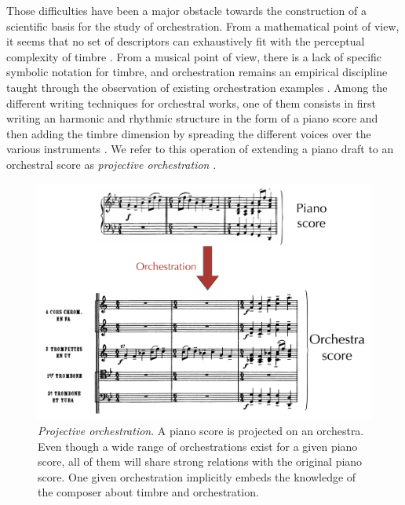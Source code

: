 \documentclass{article}
\begin{document}
Those difficulties have been a major obstacle towards the construction of a scientific basis for the study of orchestration. From a mathematical point of view, it seems that no set of descriptors can exhaustively fit with the perceptual complexity of timbre \cite{peeters2011timbre}. From a musical point of view, there is a lack of specific symbolic notation for timbre, and orchestration remains an empirical discipline taught through the observation of existing orchestration examples \cite{piston-orch}. Among the different writing techniques for orchestral works, one of them consists in first writing an harmonic and rhythmic structure in the form of a piano score and then adding the timbre dimension by spreading the different voices over the various instruments \cite{piston-orch}. We refer to this operation of extending a piano draft to an orchestral score as \textit{projective orchestration} \cite{eslingthesis}.

\begin{figure}
\centering
\includegraphics[scale=0.12]{Data_representation/orch}
\caption{\textit{Projective orchestration}. A piano score is projected on an orchestra. Even though a wide range of orchestrations exist for a given piano score, all of them will share strong relations with the original piano score. One given orchestration implicitly embeds the knowledge of the composer about timbre and orchestration.}
\label{fig:orch}
\end{figure}
\end{document}
